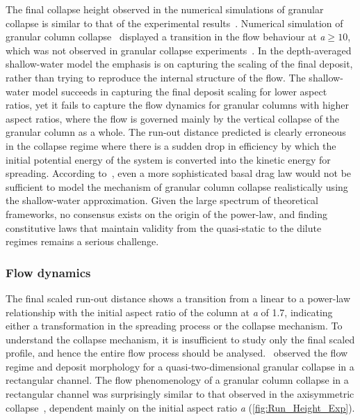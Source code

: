 The final collapse height observed in the numerical simulations of granular 
collapse is similar to that of the experimental 
results~\citep{Lube2005,Balmforth2005}. Numerical simulation of granular 
column collapse~\citep{Lacaze2008,Staron2007a} displayed a transition in the 
flow behaviour at \textit{a}$\ge 10$, which was not observed in granular 
collapse experiments~\citep{Balmforth2005,Lube2005,Lajeunesse2004}. In the 
depth-averaged shallow-water model the 
emphasis is on capturing the scaling of the final deposit, rather than trying 
to reproduce the internal structure of the flow. The shallow-water model 
succeeds in capturing the final deposit scaling for lower aspect ratios, 
yet it fails to capture the flow dynamics for granular columns with higher 
aspect ratios, 
where the flow is governed mainly by the vertical collapse of the granular 
column as a whole. The run-out distance predicted is clearly erroneous in the 
collapse regime where there is a sudden drop in efficiency by which the initial 
potential energy of the system is converted into the kinetic energy for 
spreading. According to~\citet{Kerswell2005}, even a more sophisticated basal 
drag law would not be sufficient to model the mechanism of granular column 
collapse realistically using the 
shallow-water approximation. Given the large 
spectrum of theoretical frameworks, no consensus exists on the origin of the 
power-law, and finding constitutive laws that maintain validity from the 
quasi-static to the dilute regimes remains a serious challenge. 


\subsubsection{Flow dynamics}


The final scaled run-out distance shows a transition from a linear to a 
power-law relationship with the initial aspect ratio of the column at 
\textit{a} of 1.7, indicating either a transformation in the spreading process 
or the 
collapse mechanism. To 
understand the collapse mechanism, it is insufficient to study only the final 
scaled profile, and hence the entire flow process should be 
analysed.~\citet{Lajeunesse2005} observed the flow regime and deposit 
morphology for a quasi-two-dimensional granular collapse in a rectangular 
channel. The flow phenomenology of a granular column collapse in a rectangular 
channel was surprisingly similar to that observed in the axisymmetric 
collapse~\citep{Lube2005,Lajeunesse2004}, dependent mainly on the initial 
aspect ratio \textit{a} (\cref{fig:Run_Height_Exp}). 

